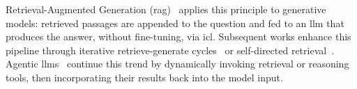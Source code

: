 
Retrieval-Augmented Generation (\ac{rag})~\cite{lewis2020retrievalaugmented,gao2024retrievalaugmentedgenerationlargelanguage} applies this principle to generative models: retrieved passages are appended to the question and fed to an \ac{llm} that produces the answer, without fine-tuning, via \acl{icl}. Subsequent works enhance this pipeline through iterative retrieve-generate cycles~\cite{shao-etal-2023-enhancing} or self-directed retrieval~\cite{asai2023selfrag}.  
Agentic \acp{llm}~\cite{xi2025rise,yao2023reactsynergizingreasoningacting,plaat2025agenticlargelanguagemodels} continue this trend by dynamically invoking retrieval or reasoning tools, then incorporating their results back into the model input.

